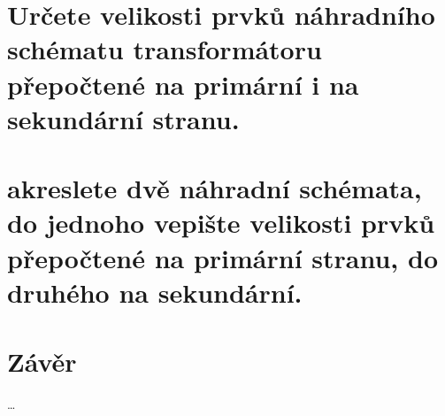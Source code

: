 \documentclass{protokol}
\begin{document}
\section{Určete velikosti prvků náhradního schématu transformátoru přepočtené na primární
i na sekundární stranu.}

 \section{akreslete dvě náhradní schémata, do jednoho vepište velikosti prvků přepočtené
na primární stranu, do druhého na sekundární.}

\section{Závěr}
\dots
\end{document}

